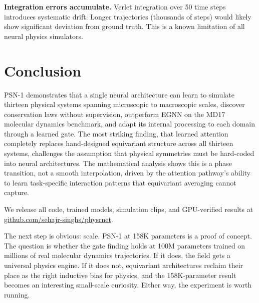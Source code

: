 \documentclass[10pt,twocolumn]{article}
\begin{document}
\textbf{Integration errors accumulate.} Verlet integration over 50 time steps introduces systematic drift. Longer trajectories (thousands of steps) would likely show significant deviation from ground truth. This is a known limitation of all neural physics simulators.

\section{Conclusion}

PSN-1 demonstrates that a single neural architecture can learn to simulate thirteen physical systems spanning microscopic to macroscopic scales, discover conservation laws without supervision, outperform EGNN on the MD17 molecular dynamics benchmark, and adapt its internal processing to each domain through a learned gate. The most striking finding, that learned attention completely replaces hand-designed equivariant structure across all thirteen systems, challenges the assumption that physical symmetries must be hard-coded into neural architectures. The mathematical analysis shows this is a phase transition, not a smooth interpolation, driven by the attention pathway's ability to learn task-specific interaction patterns that equivariant averaging cannot capture.

We release all code, trained models, simulation clips, and GPU-verified results at \href{https://github.com/sehajr-singhs/physrnet}{github.com/sehajr-singhs/physrnet}.

The next step is obvious: scale. PSN-1 at 158K parameters is a proof of concept. The question is whether the gate finding holds at 100M parameters trained on millions of real molecular dynamics trajectories. If it does, the field gets a universal physics engine. If it does not, equivariant architectures reclaim their place as the right inductive bias for physics, and the 158K-parameter result becomes an interesting small-scale curiosity. Either way, the experiment is worth running.
\end{document}
